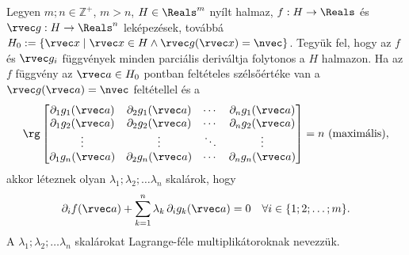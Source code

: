 \begin{definition}
  Legyen $m;n \in \mathbb Z^+$, $m > n$, $H \in \Reals^m$ nyílt halmaz,
  $f: H \to \Reals$ és $\rvec g : H \to \Reals^n$ leképezések, továbbá
  $H_0 := \{ \rvec x \mid \rvec x \in H \land \rvec g (\rvec x) = \nvec\}$.
  Tegyük fel, hogy az $f$ és $\rvec g_i$ függvények minden parciális deriváltja
  folytonos a $H$ halmazon. Ha az $f$ függvény az $\rvec a \in H_0$ pontban
  feltételes szélsőértéke van a $\rvec g(\rvec a) = \nvec$ feltétellel és a
  \def\arraystretch{1.5}
  $$
    \rg \begin{bmatrix}
      \partial_1 g_1 (\rvec a) & \partial_2 g_1 (\rvec a) & \cdots & \partial_n g_1 (\rvec a) \\
      \partial_1 g_2 (\rvec a) & \partial_2 g_2 (\rvec a) & \cdots & \partial_n g_2 (\rvec a) \\
      \vdots                   & \vdots                   & \ddots & \vdots                   \\
      \partial_1 g_n (\rvec a) & \partial_2 g_n (\rvec a) & \cdots & \partial_n g_n (\rvec a)
    \end{bmatrix} = n
    \text{ (maximális)},
  $$
  akkor léteznek olyan $\lambda_1; \lambda_2; \ldots \lambda_n$ skalárok, hogy
  $$
    \partial_i f(\rvec a)
    + \sum_{k = 1}^{n} \lambda_k \,\partial_i g_k(\rvec a) = 0
    \quad
    \forall i \in \{1;2;\ldots;m\}
    \text.
  $$
  A $\lambda_1; \lambda_2; \ldots \lambda_n$ skalárokat Lagrange-féle
  multiplikátoroknak nevezzük.
\end{definition}